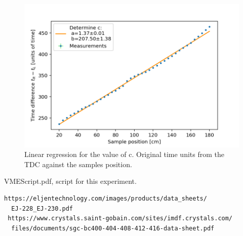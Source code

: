 \documentclass[]{article}
\begin{document}
\begin{figure}[H]
\centering
\includegraphics[width=1\textwidth]{Plots/PosTimeUnit.png}
\caption{Linear regression for the value of c. Original time units from the TDC against the samples position. }
\label{fig:c fit units}
\end{figure}

\newpage
\begin{thebibliography}{}

 VMEScript.pdf, script for this experiment.

 \begin{verbatim}
https://eljentechnology.com/images/products/data_sheets/
  EJ-228_EJ-230.pdf
 https://www.crystals.saint-gobain.com/sites/imdf.crystals.com/
  files/documents/sgc-bc400-404-408-412-416-data-sheet.pdf
\end{verbatim} 


\end{thebibliography}
\end{document}
